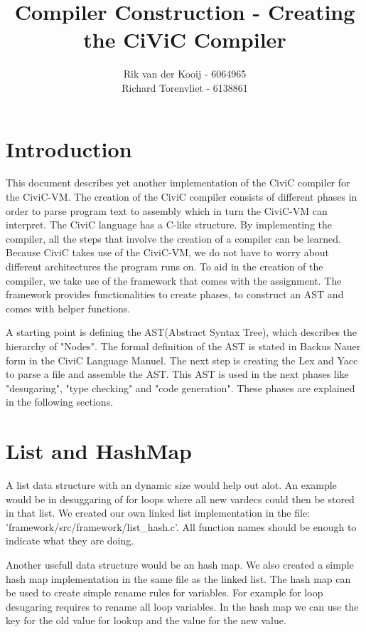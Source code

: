 \documentclass[a4paper]{article}
\author{Rik van der Kooij - 6064965\\
Richard Torenvliet - 6138861}
\title{Compiler Construction - Creating the CiViC Compiler}
\begin{document}
\lstset{
    numbers=left,
    tabsize=2,
}


\maketitle
\tableofcontents


\section{Introduction}
This document describes yet another implementation of the CiviC compiler for
the CiviC-VM. The creation of the CiviC compiler consists of different phases
in order to parse program text to assembly which in turn the CiviC-VM can
interpret. The CiviC language has a C-like structure. By implementing the
compiler, all the steps that involve the creation of a compiler can be learned.
Because CiviC takes use of the CiviC-VM, we do not have to worry about
different architectures the program runs on. To aid in the creation of the
compiler, we take use of the framework that comes with the assignment. The framework provides
functionalities to create phases, to construct an AST and comes with helper
functions.

A starting point is defining the AST(Abstract Syntax Tree), which describes the
hierarchy of "Nodes". The formal definition of the AST is stated in Backus
Nauer form in the CiviC Language Manuel. The next step is creating the Lex and
Yacc to parse a file and assemble the AST. This AST is used in the next phases
like "desugaring", "type checking" and "code generation". These phases are
explained in the following sections.

\section{List and HashMap}
A list data structure with an dynamic size would help out alot. An example
would be in  desuggaring of for loops where all new vardecs could then be
stored in that list. We created our own linked list implementation in the file:
'framework/src/framework/list\_hash.c'. All function names should be enough to
indicate what they are doing.

Another usefull data structure would be an hash map. We also created a simple
hash map implementation in the same file as the linked list. The hash map can
be used to create simple rename rules for variables. For example for loop
desugaring requires to rename all loop variables. In the hash map we can use
the key for the old value for lookup and the value for the new value.
\end{document}
